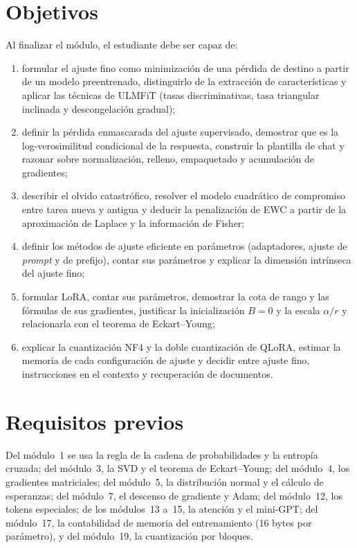 \documentclass[11pt,a4paper,twoside,openany]{book}
\begin{document}
\section*{Objetivos}
Al finalizar el módulo, el estudiante debe ser capaz de:
\begin{enumerate}[label=\arabic*.]
  \item formular el ajuste fino como minimización de una pérdida de destino a partir de un modelo preentrenado, distinguirlo de la extracción de características y aplicar las técnicas de ULMFiT (tasas discriminativas, tasa triangular inclinada y descongelación gradual);
  \item definir la pérdida enmascarada del ajuste supervisado, demostrar que es la log-verosimilitud condicional de la respuesta, construir la plantilla de chat y razonar sobre normalización, relleno, empaquetado y acumulación de gradientes;
  \item describir el olvido catastrófico, resolver el modelo cuadrático de compromiso entre tarea nueva y antigua y deducir la penalización de EWC a partir de la aproximación de Laplace y la información de Fisher;
  \item definir los métodos de ajuste eficiente en parámetros (adaptadores, ajuste de \emph{prompt} y de prefijo), contar sus parámetros y explicar la dimensión intrínseca del ajuste fino;
  \item formular LoRA, contar sus parámetros, demostrar la cota de rango y las fórmulas de sus gradientes, justificar la inicialización $B=0$ y la escala $\alpha/r$ y relacionarla con el teorema de Eckart--Young;
  \item explicar la cuantización NF4 y la doble cuantización de QLoRA, estimar la memoria de cada configuración de ajuste y decidir entre ajuste fino, instrucciones en el contexto y recuperación de documentos.
\end{enumerate}

\section*{Requisitos previos}
Del módulo~1 se usa la regla de la cadena de probabilidades y la entropía cruzada; del módulo~3, la SVD y el teorema de Eckart--Young; del módulo~4, los gradientes matriciales; del módulo~5, la distribución normal y el cálculo de esperanzas; del módulo~7, el descenso de gradiente y Adam; del módulo~12, los tokens especiales; de los módulos~13 a~15, la atención y el mini-GPT; del módulo~17, la contabilidad de memoria del entrenamiento (16 bytes por parámetro), y del módulo~19, la cuantización por bloques.
\end{document}
